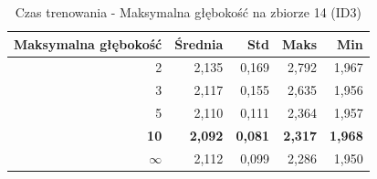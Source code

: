 \begin{table}[htbp]
\centering
\small
\setlength{\tabcolsep}{6pt}
\renewcommand{\arraystretch}{1.2}
\caption{Czas trenowania - Maksymalna głębokość na zbiorze 14 (ID3)}
\label{tab:ID3_max_depth_14_time}
\begin{tabular}{r|r|r|r|r}
\toprule
Maksymalna głębokość & Średnia & Std & Maks & Min \\
\hline
2 & 2,135 & 0,169 & 2,792 & 1,967 \\
3 & 2,117 & 0,155 & 2,635 & 1,956 \\
5 & 2,110 & 0,111 & 2,364 & 1,957 \\
\textbf{10} & \textbf{2,092} & \textbf{0,081} & \textbf{2,317} & \textbf{1,968} \\
$\infty$ & 2,112 & 0,099 & 2,286 & 1,950 \\
\bottomrule
\end{tabular}
\end{table}